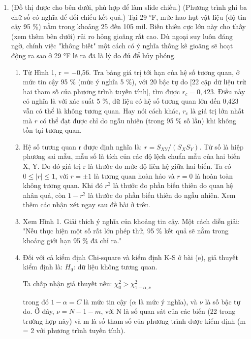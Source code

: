 \begin{enumerate}
\def\labelenumi{\arabic{enumi}.}
\item
  (Đồ thị được cho bên dưới, phù hợp để làm slide chiếu.) (Phương trình ghi ba chữ số có nghĩa để đối chiếu kết quả.) Tại 29 °F, mức hao hụt vật liệu (độ tin cậy 95 \%) nằm trong khoảng 25 đến 105 mil. Biến thiên cực lớn này cho thấy (xem thêm bên dưới) rủi ro hỏng gioăng rất cao. Dù ngoại suy luôn đáng ngờ, chính việc "không biết" một cách có ý nghĩa thống kê gioăng sẽ hoạt động ra sao ở 29 °F lẽ ra đã là lý do đủ để hủy phóng.

  \begin{enumerate}
  \def\labelenumii{\alph{enumii}.}
  \item
    Từ Hình 1, r = \ensuremath{-}0,56. Tra bảng giá trị tới hạn của hệ số tương quan, ở mức tin cậy 95 \% (mức ý nghĩa 5 \%), với 20 bậc tự do {[}22 cặp dữ liệu trừ hai tham số của phương trình tuyến tính{]}, tìm được \(r_c = 0{,}423\). Điều này có nghĩa là với xác suất 5 \%, dữ liệu có hệ số tương quan lớn đến 0,423 vẫn có thể là không tương quan. Hay nói cách khác, \(r_c\) là giá trị lớn nhất mà \(r\) có thể đạt được chỉ do ngẫu nhiên (trong 95 \% số lần) khi không tồn tại tương quan.
  \item
    Hệ số tương quan r được định nghĩa là: \(r = S_{XY}/(S_X S_Y)\). Tử số là hiệp phương sai mẫu, mẫu số là tích của các độ lệch chuẩn mẫu của hai biến X, Y. Do đó giá trị r là thước đo mức độ liên hệ giữa hai biến. Ta có \(0 \le |r| \le 1\), với \(r = \pm 1\) là tương quan hoàn hảo và \(r = 0\) là hoàn toàn không tương quan. Khi đó \(r^2\) là thước đo phần biến thiên do quan hệ nhân quả, còn \(1 - r^2\) là thước đo phần biến thiên do ngẫu nhiên. Xem thêm các nhận xét ngay sau đề bài ở trên.
  \item
    Xem Hình 1. Giải thích ý nghĩa của khoảng tin cậy. Một cách diễn giải: "Nếu thực hiện một số rất lớn phép thử, 95 \% kết quả sẽ nằm trong khoảng giới hạn 95 \% đã chỉ ra."
  \item
    Đối với cả kiểm định Chi-square và kiểm định K-S ở bài (e), giả thuyết kiểm định là: \(H_0\): dữ liệu không tương quan.

    Ta chấp nhận giả thuyết nếu: \(\chi_0^2 > \chi^2_{1-\alpha,\nu}\)

    trong đó \(1 - \alpha = C\) là mức tin cậy (\(\alpha\) là mức ý nghĩa), và \(\nu\) là số bậc tự do. Ở đây, \(\nu = N - 1 - m\), với N là số quan sát của các biến (22 trong trường hợp này) và m là số tham số của phương trình được kiểm định (m = 2 với phương trình tuyến tính).


\end{enumerate}
\end{enumerate}
